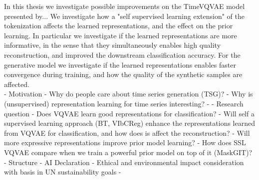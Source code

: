 \documentclass[../../thesis.tex]{subfiles}
\begin{document}
In this thesis we investigate possible improvements on the TimeVQVAE model presented by... We investigate how a "self supervised learning extension" of the tokenization affects the learned representations, and the effect on the prior learning. In particular we investigate if the learned representations are more informative, in the sense that they simultaneously enables high quality reconstruction, and improved the downstream classification accuracy. For the generative model we investigate if the learned representations enables faster convergence during training, and how the quality of the synthetic samples are affected. \\


- Motivation
	- Why do people care about time series generation (TSG)?
	- Why is (unsupervised) representation learning for time series interesting?
	- 
- Research question
	- Does VQVAE learn good representations for classification?
	- Will self a supervised learning approach (BT, VIbCReg) enhance the representations learned from VQVAE for classification, and how does is affect the reconstruction? 
	- Will more expressive representations improve prior model learning?
	- How does SSL VQVAE compare when we train a powerful prior model on top of it (MaskGIT)? 
- Structure
- AI Declaration
- Ethical and environmental impact consideration with basis in UN sustainability goals
- 
\end{document}

